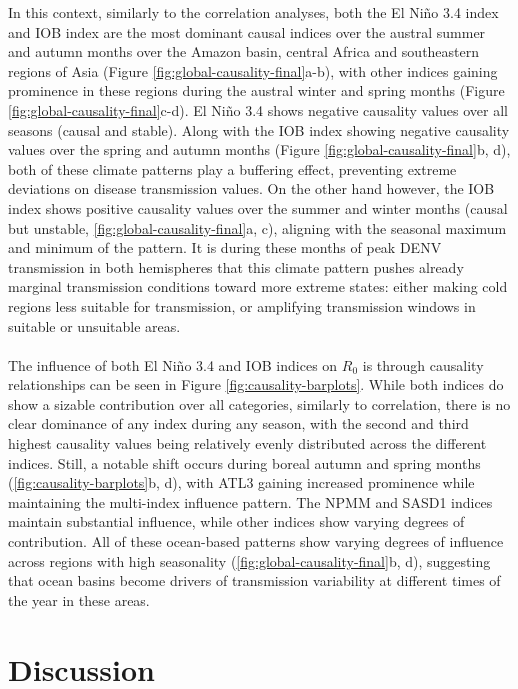 \documentclass[10pt,twocolumn]{wlscirep}
\begin{document}
In this context, similarly to the correlation analyses, both the El Niño 3.4 index and IOB index are the most dominant causal indices over the austral summer and autumn months over the Amazon basin, central Africa and southeastern regions of Asia (Figure \ref{fig:global-causality-final}a-b), with other indices gaining prominence in these regions during the austral winter and spring months (Figure \ref{fig:global-causality-final}c-d). El Niño 3.4 shows negative causality values over all seasons (causal and stable). Along with the IOB index showing negative causality values over the spring and autumn months (Figure \ref{fig:global-causality-final}b, d), both of these climate patterns play a buffering effect, preventing extreme deviations on disease transmission values. On the other hand however, the IOB index shows positive causality values over the summer and winter months (causal but unstable, \ref{fig:global-causality-final}a, c), aligning with the seasonal maximum and minimum of the pattern. It is during these months of peak DENV transmission in both hemispheres that this climate pattern pushes already marginal transmission conditions toward more extreme states: either making cold regions less suitable for transmission, or amplifying transmission windows in suitable or unsuitable areas.
\\
\\
The influence of both El Niño 3.4 and IOB indices on $R_0$ is through causality relationships can be seen in Figure \ref{fig:causality-barplots}. While both indices do show a sizable contribution over all categories, similarly to correlation, there is no clear dominance of any index during any season, with the second and third highest causality values being relatively evenly distributed across the different indices. Still, a notable shift occurs during boreal autumn and spring months (\ref{fig:causality-barplots}b, d), with ATL3 gaining increased prominence while maintaining the multi-index influence pattern. The NPMM and SASD1 indices maintain substantial influence, while other indices show varying degrees of contribution. All of these ocean-based patterns show varying degrees of influence across regions with high seasonality (\ref{fig:global-causality-final}b, d), suggesting that ocean basins become drivers of transmission variability at different times of the year in these areas.

\section{Discussion} \label{sec-discussion}
\end{document}
